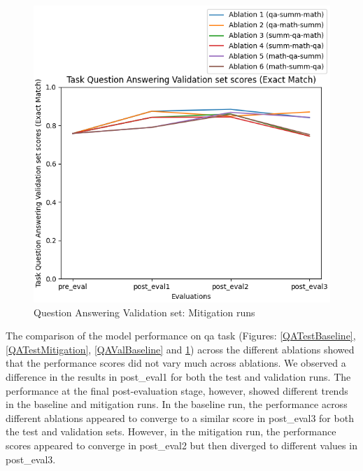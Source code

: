 \begin{figure}[H]
\begin{minipage}{0.45\textwidth}
        \includegraphics[width=1.1\textwidth]{Figures/results/trace_mitigation_graphs/task_eval/qa_val_Validation_mitigation.png} %
        \captionsetup{width=1.1\textwidth}
        \caption{Question Answering Validation set: Mitigation runs}
        \label{QAValMitigation}
    \end{minipage}
\end{figure}

The comparison of the model performance on qa task (Figures: \ref{QATestBaseline}, \ref{QATestMitigation}, \ref{QAValBaseline} and \ref{QAValMitigation}) across the different ablations showed that the performance scores did not vary much across ablations. We observed a difference in the results in post\_eval1 for both the test and validation runs. The performance at the final post-evaluation stage, however, showed different trends in the baseline and mitigation runs. In the baseline run, the performance across different ablations appeared to converge to a similar score in post\_eval3 for both the test and validation sets. However, in the mitigation run, the performance scores appeared to converge in post\_eval2 but then diverged to different values in post\_eval3. 

